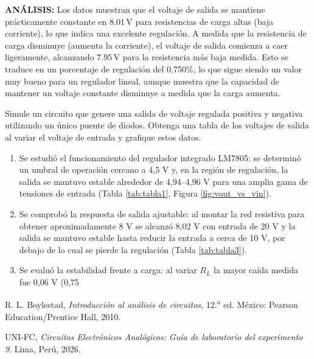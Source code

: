 \documentclass[12pt,a4paper]{article}
\begin{document}
\textbf{ANÁLISIS:} Los datos muestran que el voltaje de salida se mantiene prácticamente constante en $8.01\,$V para resistencias de carga altas (baja corriente), lo que indica una excelente regulación. A medida que la resistencia de carga disminuye (aumenta la corriente), el voltaje de salida comienza a caer ligeramente, alcanzando $7.95\,$V para la resistencia más baja medida. Esto se traduce en un porcentaje de regulación del 0,750\%, lo que sigue siendo un valor muy bueno para un regulador lineal, aunque muestra que la capacidad de mantener un voltaje constante disminuye a medida que la carga aumenta.

\newpage
{}
Simule un circuito que genere una salida de voltaje regulada positiva y negativa utilizando un único puente de diodos. Obtenga una tabla de los voltajes de salida al variar el voltaje de entrada y grafique estos datos.

\begin{enumerate}
	\item Se estudió el funcionamiento del regulador integrado LM7805: se determinó un umbral de operación cercano a 4,5 V y, en la región de regulación, la salida se mantuvo estable alrededor de 4,94–4,96 V para una amplia gama de tensiones de entrada (Tabla \ref{tab:tabla1}, Figura \ref{fig:vout_vs_vin}).

	\item Se comprobó la respuesta de salida ajustable: al montar la red resistiva para obtener aproximadamente 8 V se alcanzó 8,02 V con entrada de 20 V y la salida se mantuvo estable hasta reducir la entrada a cerca de 10 V, por debajo de lo cual se pierde la regulación (Tabla \ref{tab:tabla3}).

	\item Se evaluó la estabilidad frente a carga: al variar $R_L$ la mayor caída medida fue 0,06 V (0,75%
\end{enumerate}


\begin{enumerate}[label={[\arabic*]}]
	\item R. L. Boylestad, \textit{Introducción al análisis de circuitos}, 12.\textsuperscript{a} ed. México: Pearson Education/Prentice Hall, 2010.
    \item UNI-FC, \textit{Circuitos Electrónicos Analógicos: Guía de laboratorio del experimento 9}. Lima, Perú, 2026.
\end{enumerate}
\end{document}
